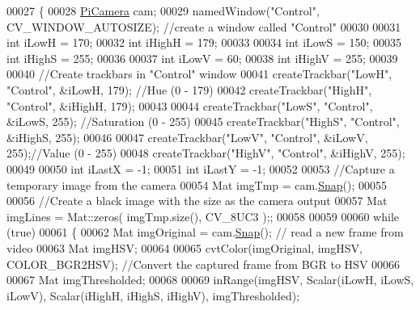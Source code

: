 \begin{DoxyCode}
00027                                       \{
00028         \hyperlink{classChipChipArray_1_1PiCamera}{PiCamera} cam;
00029         namedWindow(\textcolor{stringliteral}{"Control"}, CV\_WINDOW\_AUTOSIZE); \textcolor{comment}{//create a window called "Control"}
00030 
00031         \textcolor{keywordtype}{int} iLowH = 170;
00032         \textcolor{keywordtype}{int} iHighH = 179;
00033 
00034         \textcolor{keywordtype}{int} iLowS = 150; 
00035         \textcolor{keywordtype}{int} iHighS = 255;
00036 
00037         \textcolor{keywordtype}{int} iLowV = 60;
00038         \textcolor{keywordtype}{int} iHighV = 255;
00039 
00040         \textcolor{comment}{//Create trackbars in "Control" window}
00041         createTrackbar(\textcolor{stringliteral}{"LowH"}, \textcolor{stringliteral}{"Control"}, &iLowH, 179); \textcolor{comment}{//Hue (0 - 179)}
00042         createTrackbar(\textcolor{stringliteral}{"HighH"}, \textcolor{stringliteral}{"Control"}, &iHighH, 179);
00043 
00044         createTrackbar(\textcolor{stringliteral}{"LowS"}, \textcolor{stringliteral}{"Control"}, &iLowS, 255); \textcolor{comment}{//Saturation (0 - 255)}
00045         createTrackbar(\textcolor{stringliteral}{"HighS"}, \textcolor{stringliteral}{"Control"}, &iHighS, 255);
00046 
00047         createTrackbar(\textcolor{stringliteral}{"LowV"}, \textcolor{stringliteral}{"Control"}, &iLowV, 255);\textcolor{comment}{//Value (0 - 255)}
00048         createTrackbar(\textcolor{stringliteral}{"HighV"}, \textcolor{stringliteral}{"Control"}, &iHighV, 255);
00049 
00050         \textcolor{keywordtype}{int} iLastX = -1; 
00051         \textcolor{keywordtype}{int} iLastY = -1;
00052 
00053         \textcolor{comment}{//Capture a temporary image from the camera}
00054         Mat imgTmp = cam.\hyperlink{classChipChipArray_1_1PiCamera_a58fb0de02570dce9a9cb60a1a04fb84f}{Snap}();
00055 
00056         \textcolor{comment}{//Create a black image with the size as the camera output}
00057         Mat imgLines = Mat::zeros( imgTmp.size(), CV\_8UC3 );;
00058 
00059 
00060         \textcolor{keywordflow}{while} (\textcolor{keyword}{true})
00061         \{
00062             Mat imgOriginal = cam.\hyperlink{classChipChipArray_1_1PiCamera_a58fb0de02570dce9a9cb60a1a04fb84f}{Snap}(); \textcolor{comment}{// read a new frame from video}
00063             Mat imgHSV;
00064 
00065             cvtColor(imgOriginal, imgHSV, COLOR\_BGR2HSV); \textcolor{comment}{//Convert the captured frame from BGR to HSV}
00066 
00067             Mat imgThresholded;
00068 
00069             inRange(imgHSV, Scalar(iLowH, iLowS, iLowV), Scalar(iHighH, iHighS, iHighV), imgThresholded); \textcolor{comment}{
}
\end{DoxyCode}
